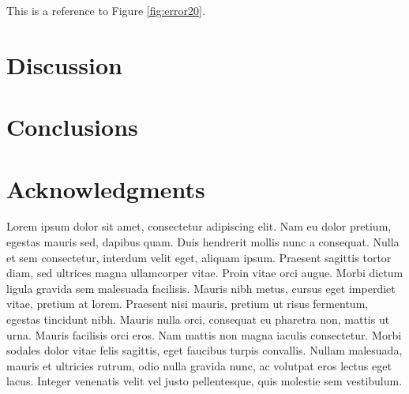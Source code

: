 \documentclass[paper,twocolumn,twoside]{geophysics}
\begin{document}
This is a reference to Figure \ref{fig:error20}.




\section{Discussion}

\section{Conclusions}

\section{Acknowledgments}

Lorem ipsum dolor sit amet, consectetur adipiscing elit. Nam eu dolor pretium,
egestas mauris sed, dapibus quam. Duis hendrerit mollis nunc a consequat. Nulla
et sem consectetur, interdum velit eget, aliquam ipsum. Praesent sagittis
tortor diam, sed ultrices magna ullamcorper vitae. Proin vitae orci augue.
Morbi dictum ligula gravida sem malesuada facilisis. Mauris nibh metus, cursus
eget imperdiet vitae, pretium at lorem. Praesent nisi mauris, pretium ut risus
fermentum, egestas tincidunt nibh. Mauris nulla orci, consequat eu pharetra
non, mattis ut urna. Mauris facilisis orci eros. Nam mattis non magna iaculis
consectetur. Morbi sodales dolor vitae felis sagittis, eget faucibus turpis
convallis. Nullam malesuada, mauris et ultricies rutrum, odio nulla gravida
nunc, ac volutpat eros lectus eget lacus. Integer venenatis velit vel justo
pellentesque, quis molestie sem vestibulum.



\end{document}
